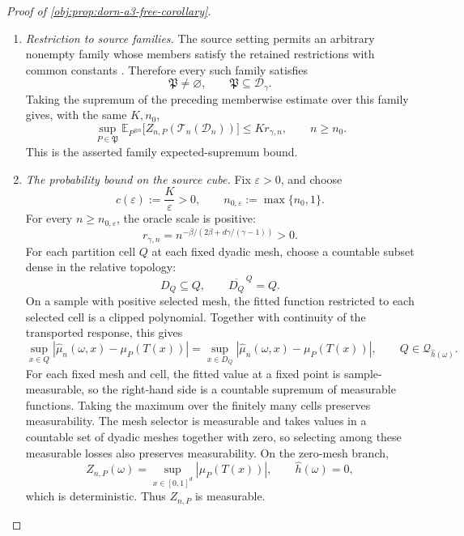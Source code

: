 \documentclass[11pt]{article}
\begin{document}
\begin{proof}[Proof of \cref{obj:prop:dorn-a3-free-corollary}]
\begin{enumerate}
\item \emph{Restriction to source families.}
The source setting permits an arbitrary nonempty family whose members satisfy the retained restrictions with common constants
\citep[Section 2, Assumptions 1--2, pp.~3--7]{Dorn2026GlobalOverlap}.
Therefore every such family satisfies
\[
\mathfrak P\ne\varnothing,
\qquad
\mathfrak P\subseteq\mathcal D_\gamma.
\]
Taking the supremum of the preceding memberwise estimate over this family gives, with the same \(K,n_0\),
\[
\sup_{P\in\mathfrak P}
\mathbb E_{P^{\otimes n}}
\bigl[Z_{n,P}(\mathcal T_n(\mathcal D_n))\bigr]
\le K r_{\gamma,n},
\qquad n\ge n_0.
\]
This is the asserted family expected-supremum bound.

\item \emph{The probability bound on the source cube.}
Fix \(\varepsilon>0\), and choose
\[
c(\varepsilon):=\frac K\varepsilon>0,
\qquad
n_{0,\varepsilon}:=\max\{n_0,1\}.
\]
For every \(n\ge n_{0,\varepsilon}\), the oracle scale is positive:
\[
r_{\gamma,n}
=
n^{-\beta/(2\beta+d\gamma/(\gamma-1))}>0.
\]
For each partition cell \(Q\) at each fixed dyadic mesh, choose a countable subset dense in the relative topology:
\[
D_Q\subseteq Q,
\qquad
\overline{D_Q}^{\,Q}=Q.
\]
On a sample with positive selected mesh, the fitted function restricted to each selected cell is a clipped polynomial. Together with continuity of the transported response, this gives
\[
\sup_{x\in Q}
|\widehat\mu_n(\omega,x)-\mu_P(T(x))|
=
\sup_{x\in D_Q}
|\widehat\mu_n(\omega,x)-\mu_P(T(x))|,
\qquad Q\in\mathcal Q_{\widehat h(\omega)}.
\]
For each fixed mesh and cell, the fitted value at a fixed point is sample-measurable, so the right-hand side is a countable supremum of measurable functions. Taking the maximum over the finitely many cells preserves measurability. The mesh selector is measurable and takes values in a countable set of dyadic meshes together with zero, so selecting among these measurable losses also preserves measurability. On the zero-mesh branch,
\[
Z_{n,P}(\omega)
=
\sup_{x\in[0,1]^d}|\mu_P(T(x))|,
\qquad \widehat h(\omega)=0,
\]
which is deterministic. Thus \(Z_{n,P}\) is measurable.


\end{enumerate}
\end{proof}
\end{document}
